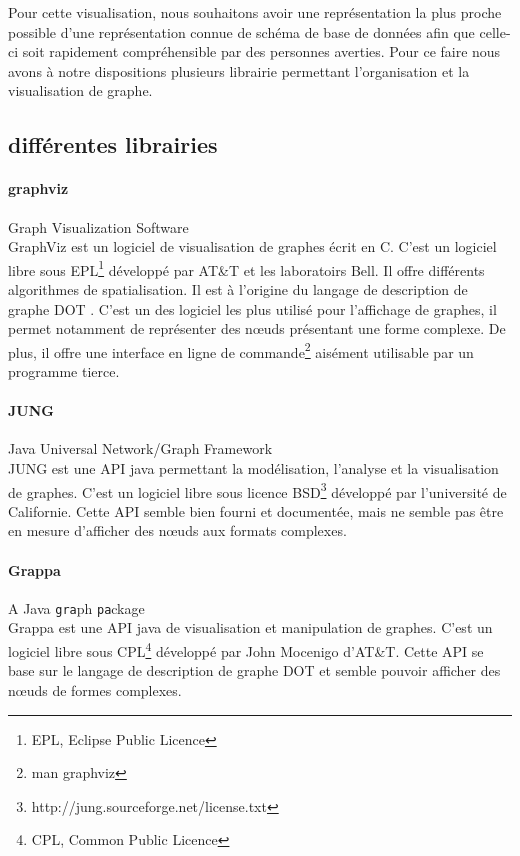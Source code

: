 	Pour cette visualisation, nous souhaitons avoir une représentation la plus proche possible d'une représentation connue de schéma de base de données afin que celle-ci soit rapidement compréhensible par des personnes averties. Pour ce faire nous avons à notre dispositions plusieurs librairie permettant l'organisation et la visualisation de graphe.

  \subsection{différentes librairies}
  	\paragraph{graphviz} Graph Visualization Software\\
			GraphViz est un logiciel de visualisation de graphes écrit en C. C'est un logiciel libre sous EPL\footnote{EPL, Eclipse Public Licence} développé par AT\&T et les laboratoirs Bell. Il offre différents algorithmes de spatialisation. Il est à l'origine du langage de description de graphe \og DOT \fg{}. C'est un des logiciel les plus utilisé pour l'affichage de graphes, il permet notamment de représenter des nœuds présentant une forme complexe. De plus, il offre une interface en ligne de commande\footnote{man graphviz} aisément utilisable par un programme tierce.
		\paragraph{JUNG} Java Universal Network/Graph Framework\\
				JUNG est une API java permettant la modélisation, l'analyse et la visualisation de graphes. C'est un logiciel libre sous licence BSD\footnote{http://jung.sourceforge.net/license.txt} développé par l'université de Californie. Cette API semble bien fourni et documentée, mais ne semble pas être en mesure d'afficher des nœuds aux formats complexes. 
		\paragraph{Grappa} A Java \texttt{gra}ph \texttt{pa}ckage\\
			Grappa est une API java de visualisation et manipulation de graphes. C'est un logiciel libre sous CPL\footnote{CPL, Common Public Licence} développé par John Mocenigo d'AT\&T. Cette API se base sur le langage de description de graphe \og DOT \fg{} et semble pouvoir afficher des nœuds de formes complexes.
		
